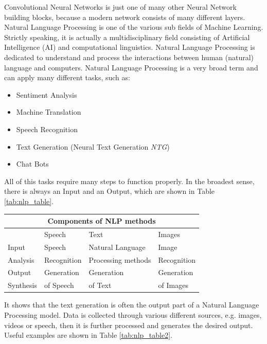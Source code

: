 Convolutional Neural Networks is just one of many other Neural Network building blocks, because a modern network consists of many different layers. Natural Language Processing is one of the various sub fields of Machine Learning. Strictly speaking, it is actually a multidisciplinary field consisting of Artificial Intelligence (AI) and computational linguistics. Natural Language Processing is dedicated to understand and process the interactions between human (natural) language and computers. Natural Language Processing is a very broad term and can apply many different tasks, such as: 

\begin{itemize}
\item Sentiment Analysis
\item Machine Translation
\item Speech Recognition
\item Text Generation (Neural Text Generation \textit{NTG})
\item Chat Bots
\end{itemize}

All of this tasks require many steps to function properly. In the broadest sense, there is always an Input and an Output, which are shown in Table \ref{tab:nlp_table}.

\begin{center} 
	\begin{tabular}{ |p{3cm}||p{3cm}|p{3cm}|p{3cm}|}
		\hline
		\multicolumn{4}{|c|}{\textbf{Components of NLP methods}}\\ \hline\hline
		&Speech &Text &Images \\ \hline
		Input &Speech &Natural Language &Image \\
		Analysis &Recognition  &Processing methods     &Recognition \\ \hline \hline
		Output &Generation &\cellcolor[HTML]{F3E687}Generation &Generation \\
		Synthesis &of Speech & \cellcolor[HTML]{F3E687}of Text &of Images \\ \hline
	\end{tabular}
	\label{tab:nlp_table}
\end{center}

It shows that the text generation is often the output part of a Natural Language Processing model. Data is collected through various different sources, e.g. images, videos or speech, then it is further processed and generates the desired output. Useful examples are shown in Table \ref{tab:nlp_table2}.

